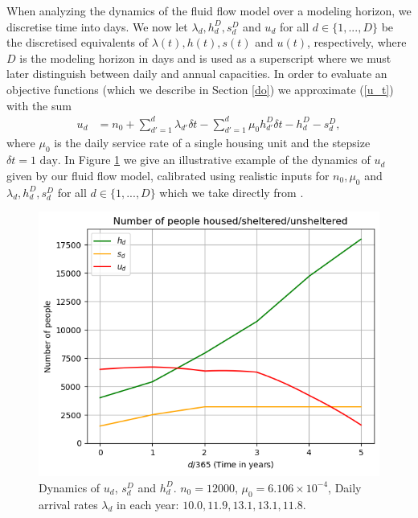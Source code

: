 \documentclass[12pt,a4paper]{article}
\begin{document}
When analyzing the dynamics of the fluid flow model over a modeling horizon, we discretise time into days. We now let $\lambda_d, h^D_d, s^D_d$ and $u_d$ for all $d \in \{1,...,D\}$ be the discretised equivalents of $\lambda(t), h(t), s(t)$ and $u(t)$, respectively, where $D$ is the modeling horizon in days and is used as a superscript where we must later distinguish between daily and annual capacities. In order to evaluate an objective functions (which we describe in Section \ref{do}) we approximate (\ref{u_t}) with the sum 
%
\begin{align} \label{u_t_discrete}
u_d & = n_0 + \sum_{d'=1}^{d} \lambda_{d'} \delta t - \sum_{d'=1}^{d} \mu_0 h^D_{d'} \delta t - h^D_d - s^D_d, 
\end{align}
%
where $\mu_0$ is the daily service rate of a single housing unit and the stepsize $\delta t = 1 \text{ day}$. In Figure \ref{fig:ut-illustrative} we give an illustrative example of the dynamics of $u_d$ given by our fluid flow model, calibrated using realistic inputs for $n_0, \mu_0$ and $\lambda_d, h^D_d, s^D_d$ for all $d \in \{1,...,D\}$ which we take directly from \cite{singham2023discrete}. 
%
\begin{figure}[h!]%
    \centering
    \includegraphics[scale=0.8]{u_t_example.png}
    \caption{Dynamics of $u_d$, $s^D_d$ and $h^D_d$. $n_0 = 12000$, $\mu_0 = 6.106 \times 10^{-4}$, Daily arrival rates $\lambda_d$ in each year: $10.0,11.9,13.1,13.1,11.8$.}
    \label{fig:ut-illustrative}
\end{figure}
%
\end{document}
